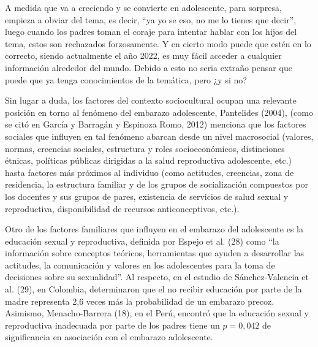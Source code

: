 \documentclass[letterpaper, 12pt]{article}
\begin{document}
A medida que va a creciendo y se convierte en adolescente,
para sorpresa, empieza a obviar del tema, es decir, ``ya yo
se eso, no me lo tienes que decir'', luego cuando los
padres toman el coraje para intentar hablar con los hijos
del tema, estos son rechazados forzosamente. Y en cierto
modo puede que estén en lo correcto, siendo actualmente el
año 2022, es muy fácil acceder a cualquier información
alrededor del mundo. Debido a esto no seria extraño pensar
que puede que ya tenga conocimientos de la temática, pero
¿y si no?

\begin{displayquote}
    Sin lugar a duda, los factores del contexto sociocultural ocupan una relevante posición en
    torno al fenómeno del embarazo adolescente, Pantelides (2004), (como se citó en García y Barragán y
    Espinoza Romo, 2012) menciona que los factores sociales que influyen en tal fenómeno abarcan
    desde un nivel macrosocial (valores, normas, creencias sociales, estructura y roles socioeconómicos,
    distinciones étnicas, políticas públicas dirigidas a la salud reproductiva adolescente, etc.) hasta
    factores más próximos al individuo (como actitudes, creencias, zona de residencia, la estructura
    familiar y de los grupos de socialización compuestos por los docentes y sus grupos de pares,
    existencia de servicios de salud sexual y reproductiva, disponibilidad de recursos anticonceptivos,
    etc.).

    \textcite{Garcia2017}

\end{displayquote}

\begin{displayquote}
    Otro de los factores familiares que influyen en el embarazo del adolescente es la educación
    sexual y reproductiva, definida por Espejo et al. (28) como “la información
    sobre conceptos teóricos, herramientas que ayuden a desarrollar las actitudes, la comunicación
    y valores en los adolescentes para la toma de decisiones sobre su sexualidad”. Al respecto, en
    el estudio de Sánchez-Valencia et al. (29), en Colombia, determinaron
    que el no recibir educación por parte de la madre representa 2,6 veces más
    la probabilidad de un embarazo precoz. Asimismo, Menacho-Barrera (18), en
    el Perú, encontró que la educación sexual y reproductiva inadecuada por
    parte de los padres tiene un $p = 0,042$ de significancia en asociación
    con el embarazo adolescente.

    \textcite{CubaSancho2022}
\end{displayquote}
\end{document}
